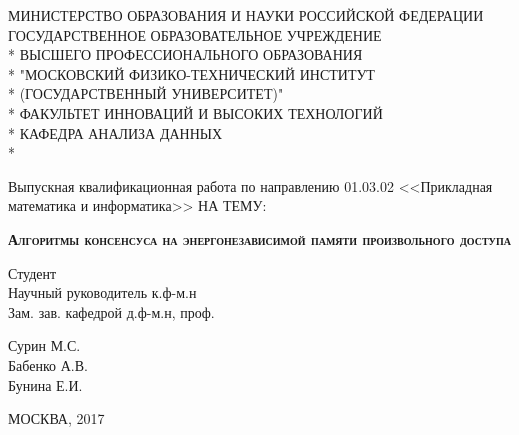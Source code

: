 \documentclass[pdftex,ptm,12pt,a4paper]{report}
\theoremstyle{definition}
\begin{document}
\begin{titlepage}
\newpage

\begin{center}
МИНИСТЕРСТВО ОБРАЗОВАНИЯ И НАУКИ РОССИЙСКОЙ ФЕДЕРАЦИИ \\
\vspace{0.5cm}
ГОСУДАРСТВЕННОЕ ОБРАЗОВАТЕЛЬНОЕ УЧРЕЖДЕНИЕ \\*
ВЫСШЕГО ПРОФЕССИОНАЛЬНОГО ОБРАЗОВАНИЯ\\*
"МОСКОВСКИЙ ФИЗИКО-ТЕХНИЧЕСКИЙ ИНСТИТУТ \\*
(ГОСУДАРСТВЕННЫЙ УНИВЕРСИТЕТ)" \\*
\vspace{0.5cm}
ФАКУЛЬТЕТ ИННОВАЦИЙ И ВЫСОКИХ ТЕХНОЛОГИЙ \\*
КАФЕДРА АНАЛИЗА ДАННЫХ \\*
\hrulefill
\end{center}


\vspace{3em}

\begin{center}
\Large Выпускная квалификационная работа по направлению 01.03.02 <<Прикладная математика и информатика>> \linebreak НА ТЕМУ:
\end{center}

\vspace{2.5em}

\begin{center}
\textsc{\large{\textbf{Алгоритмы консенсуса на энергонезависимой памяти произвольного доступа}}}
\end{center}

\vspace{6.5em}

\begin{minipage}{.45\linewidth}
\begin{flushleft}
Студент \\ Научный руководитель к.ф-м.н \\ Зам. зав. кафедрой д.ф-м.н, проф.
\end{flushleft}
\end{minipage}
\hfill
\begin{minipage}{.45\linewidth}
\begin{flushright}
    Сурин М.С.\\ Бабенко А.В.\\Бунина Е.И.
\end{flushright}
\end{minipage}

\vspace{\fill}

\begin{center}
МОСКВА, 2017
\end{center}

\end{titlepage}
\end{document}

